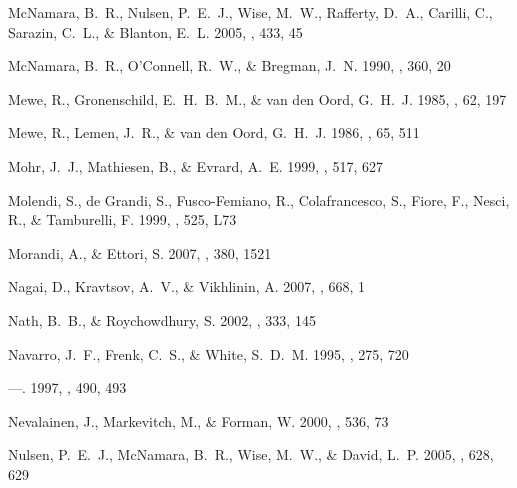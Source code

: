 \documentclass[12pt,preprint]{aastex}
\begin{document}
\begin{thebibliography}{139}
{McNamara}, B.~R., {Nulsen}, P.~E.~J., {Wise}, M.~W., {Rafferty}, D.~A.,
  {Carilli}, C., {Sarazin}, C.~L., \& {Blanton}, E.~L. 2005, \nat, 433, 45

{McNamara}, B.~R., {O'Connell}, R.~W., \& {Bregman}, J.~N. 1990, \apj, 360, 20

{Mewe}, R., {Gronenschild}, E.~H.~B.~M., \& {van den Oord}, G.~H.~J. 1985,
  \aaps, 62, 197

{Mewe}, R., {Lemen}, J.~R., \& {van den Oord}, G.~H.~J. 1986, \aaps, 65, 511

{Mohr}, J.~J., {Mathiesen}, B., \& {Evrard}, A.~E. 1999, \apj, 517, 627

{Molendi}, S., {de Grandi}, S., {Fusco-Femiano}, R., {Colafrancesco}, S.,
  {Fiore}, F., {Nesci}, R., \& {Tamburelli}, F. 1999, \apjl, 525, L73

{Morandi}, A., \& {Ettori}, S. 2007, \mnras, 380, 1521

{Nagai}, D., {Kravtsov}, A.~V., \& {Vikhlinin}, A. 2007, \apj, 668, 1

{Nath}, B.~B., \& {Roychowdhury}, S. 2002, \mnras, 333, 145

{Navarro}, J.~F., {Frenk}, C.~S., \& {White}, S.~D.~M. 1995, \mnras, 275, 720

---. 1997, \apj, 490, 493

{Nevalainen}, J., {Markevitch}, M., \& {Forman}, W. 2000, \apj, 536, 73

{Nulsen}, P.~E.~J., {McNamara}, B.~R., {Wise}, M.~W., \& {David}, L.~P. 2005,
  \apj, 628, 629


\end{thebibliography}
\end{document}
